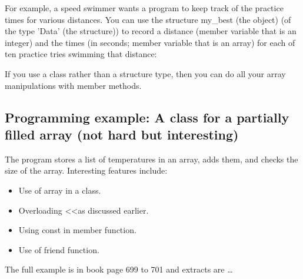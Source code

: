 For example, a speed swimmer wants a program to keep track of the practice times for
various distances. You can use the structure my\_best (the object) (of the type 'Data' (the structure))
to record a distance (member variable that is an integer) and the times (in seconds; member
variable that is an array) for each of ten practice tries swimming that distance:


If you use a class rather than a structure type, then you can do all your array manipulations
with member methods.


\subsection{Programming example: A class for a partially filled array (not hard but interesting)}
The program stores a list of temperatures in an array, adds them, and checks the size of the array.
Interesting features include:
\begin{itemize}
	\item Use of array in a class.
	\item Overloading \textless\textless as discussed earlier.
	\item Using const in member function.
	\item Use of friend function.
\end{itemize}

The full example is in book page 699 to 701 and extracts are \ldots

